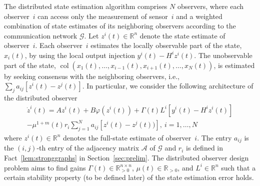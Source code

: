 \documentclass[journal]{IEEEtran}
\newcommand{\col}{\operatorname{col}}
\begin{document}
The distributed state estimation algorithm comprises $N$ observers, where each observer~$i$ can access only the measurement of sensor~$i$ and a weighted combination of state estimates of its neighboring observers according to the communication network $\mathcal G$.
Let $z^i(t)\in\mathbb R^n$ denote the state estimate of observer~$i$.
Each observer~$i$ estimates the locally observable part of the state, $x_i(t)$, by using the local output injection $y^i(t)-H^iz^i(t)$. 
The unobservable part of the state, $\col(x_1(t),\dots,x_{i-1}(t),x_{i+1}(t),\dots,x_N(t))$, is estimated by seeking consensus with the neighboring observers, i.e., $\sum_{j} a_{ij} [z^i(t)-z^j(t)]$. 
In particular, we consider the following architecture of the distributed observer
\begin{multline}\label{eq:localobserver}
    \dot z^i(t) = A z^i(t) + B\varphi(z^{i}(t)) +{\Gamma}(t) L^i[y^i(t) - H^iz^i(t)]\\
    - \mu^{1+m}(t)r_i   \sum^{N}_{j=1} a_{ij}[z^{i}(t)-z^j(t))], ~ i=1,\dots,N
\end{multline}
where $z^i(t) \in \mathbb{R}^n$ denotes the full-state estimate of observer~$i$. 
The entry $a_{ij}$ is the $(i,j)$-th entry of the adjacency matrix $\mathcal{A}$ of $\mathcal{G}$ and $r_i$ is defined in Fact~\ref{lem:stronggraphs} in Section~\ref{sec:prelim}. 
The distributed observer design problem aims to find gains $\Gamma(t)\in\mathbb R_{>0}^{n\times n}$, $\mu(t)\in\mathbb R_{>0}$, and $L^i\in\mathbb R^n$ such that a certain stability property (to be defined later) of the state estimation error holds.
\end{document}
